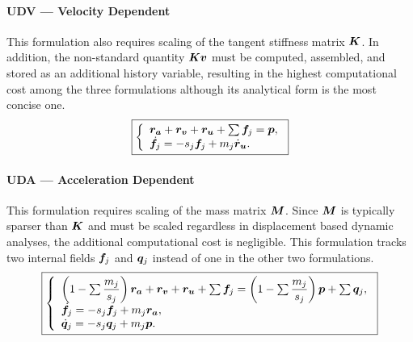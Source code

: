 \paragraph{UDV --- Velocity Dependent}
This formulation also requires scaling of the tangent stiffness matrix $\bm{K}$.
In addition, the non-standard quantity $\bm{K}\bm{v}$ must be computed, assembled, and stored as an additional history variable, resulting in the highest computational cost among the three formulations although its analytical form is the most concise one.
\begin{gather}\label{eq:v_final}
\boxed{
    \left\{\begin{array}{l}
        \bm{r}_{\bm{a}}+\bm{r}_{\bm{v}}+\bm{r}_{\bm{u}}+\sum\bm{f}_j=\bm{p}, \\
        \dot{\bm{f}}_j=-s_j\bm{f}_j+m_j\dot{\bm{r}}_{\bm{u}}.
    \end{array}\right.
}
\end{gather}
\paragraph{UDA --- Acceleration Dependent}
This formulation requires scaling of the mass matrix $\bm{M}$.
Since $\bm{M}$ is typically sparser than $\bm{K}$ and must be scaled regardless in displacement based dynamic analyses, the additional computational cost is negligible.
This formulation tracks two internal fields $\bm{f}_j$ and $\bm{q}_j$ instead of one in the other two formulations.
\begin{gather}\label{eq:a_final}
\boxed{
    \left\{\begin{array}{l}
        \left(1-\sum\dfrac{m_j}{s_j}\right)\bm{r}_{\bm{a}}+\bm{r}_{\bm{v}}+\bm{r}_{\bm{u}}+\sum\bm{f}_j=\left(1-\sum\dfrac{m_j}{s_j}\right)\bm{p}+\sum\bm{q}_j, \\
        \dot{\bm{f}}_j=-s_j\bm{f}_j+m_j\bm{r}_{\bm{a}},                                                                                      \\
        \dot{\bm{q}}_j=-s_j\bm{q}_j+m_j\bm{p}.
    \end{array}\right.
}
\end{gather}